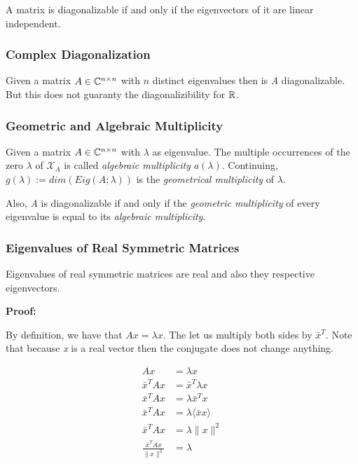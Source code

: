 A matrix is diagonalizable if and only if the eigenvectors of it are linear independent.

\subsubsection{Complex Diagonalization}

Given a matrix \(A \in \mathbb{C}^{n \times n}\) with \(n\) distinct eigenvalues then is \emph{A}
diagonalizable. But this does not guaranty the diagonalizibility for \(\mathbb{R}\).

\subsubsection{Geometric and Algebraic Multiplicity}

Given a matrix \(A \in \mathbb{C}^{n \times n}\) with \(\lambda\) as eigenvalue. The multiple occurrences 
of the zero \(\lambda\) of \(\mathcal{X}_A\) is called \emph{algebraic multiplicity} \(a(\lambda)\). 
Continuing, \(g(\lambda):= dim(Eig(A;\lambda))\) is the \emph{geometrical multiplicity} of \(\lambda\).
\vspace{\baselineskip}

Also, \emph{A} is diagonalizable if and only if the \emph{geometric multiplicity} of every eigenvalue is equal 
to its \emph{algebraic multiplicity}.

\subsubsection{Eigenvalues of Real Symmetric Matrices}

Eigenvalues of real symmetric matrices are real and also they respective eigenvectors.
\vspace{\baselineskip}

\textbf{Proof:}

By definition, we have that \(Ax = \lambda x\). The let us multiply both sides by \( \bar{x}^T\). Note 
that because \emph{x} is a real vector then the conjugate does not change anything.

\begin{align*}
    Ax &= \lambda x \\
    \bar{x}^T A x &= \bar{x}^T \lambda x \\
    \bar{x}^T A x &= \lambda \bar{x}^T x \\
    \bar{x}^T A x &= \lambda \langle \bar{x} x \rangle\\
    \bar{x}^T A x &= \lambda \|x\|^2\\
    \frac{\bar{x}^T A x}{\|x\|^2} &= \lambda
\end{align*}

